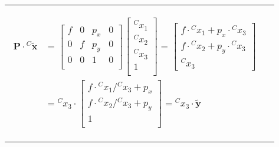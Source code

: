 \begin{longtable}{l p{12cm} }
{\begin{itemize}
\begin{itemize}
\begin{equation*}
\begin{split}
\mathbf{P}\cdot{^{C}\mathbf{\tilde{x}}}&=
\begin{bmatrix}
f & 0 & p_x & 0\\
0 & f & p_y & 0\\
0 & 0 & 1 & 0\\
\end{bmatrix}\left[\begin{array}{c}{^Cx_1}\\{^Cx_2}\\{^Cx_3}\\1\\\end{array}\right]
=\left[\begin{array}{c}
f\cdot {^Cx_1}+p_x\cdot {^Cx_3}\\
f\cdot {^Cx_2}+p_y\cdot {^Cx_3}\\
{^Cx_3}
\end{array}\right]\\
&=
{^Cx_3}\cdot\begin{bmatrix}
f\cdot{^Cx_1}/{^Cx_3}+p_x\\
f\cdot{^Cx_2}/{^Cx_3}+p_y\\
1\\
\end{bmatrix}
={^Cx_3}\cdot\mathbf{\tilde{y}}
\end{split}
\end{equation*} 

\end{itemize}
\end{itemize}

	}


\end{longtable}
